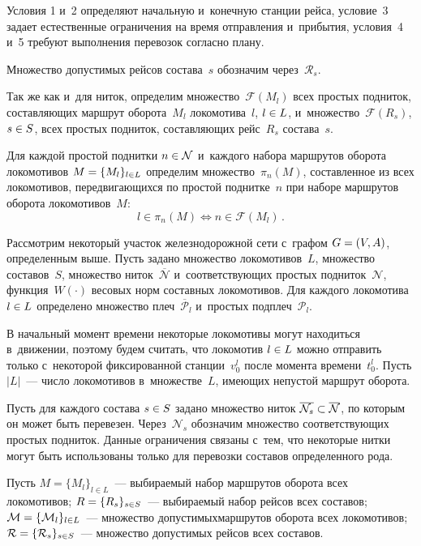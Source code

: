 \begin{multicols}{2}
Условия 1 и~2 определяют начальную и~конечную станции рейса, 
условие~3 задает естественные ограничения на время отправления и~прибытия, 
условия~4 и~5 требуют выполнения перевозок согласно плану.

Множество допустимых рейсов состава~$s$ обозначим через~$\mathcal R_s$.

Так же как и~для ниток, определим множество~$\mathcal F(M_l)$ всех простых 
подниток, со\-став\-ля\-ющих маршрут оборота~$M_l$ локомотива~$l$, $l\hm\in L$, 
и~множество~$\mathcal F(R_s)$, $s\hm\in S$, всех простых подниток, со\-став\-ля\-ющих 
рейс~$R_s$ состава~$s$.

Для каждой простой поднитки $n\hm\in\mathcal N$ и~каждого набора 
маршрутов оборота локомотивов  $M\hm=\{M_l\}_{l\in L}$ определим 
множество~$\pi_{n}(M)$, со\-став\-лен\-ное из всех локомотивов, передвигающихся 
по простой поднитке~$n$ при наборе маршрутов оборота локомотивов~$M$:
\begin{equation*}
    l\in \pi_{n}(M) \Leftrightarrow n\in\mathcal F\left(M_l\right)\,.
\end{equation*}

Рассмотрим некоторый участок железнодорожной сети с~графом $G\hm = (V, A)$, 
определенным выше. Пусть задано множество локомотивов~$L$, множество составов~$S$, 
множество ниток~$\overline{\mathcal N}$ и~соответствующих простых 
подниток~$\mathcal N$, функция~$W(\cdot)$ весовых норм составных локомотивов. 
Для каждого локомотива $l\hm\in L$ определено множество плеч~$\overline{\mathcal P}_l$ 
и~простых подплеч~$\mathcal P_l$.

В начальный момент времени некоторые локомотивы могут находиться в~движении, 
поэтому будем считать, что локомотив $l\hm\in L$ можно отправить только 
с~некоторой фиксированной станции~$v_0^l$ после момента времени~$t_0^l$.
Пусть  $|L|$~--- число локомотивов в~множестве~$L$, имеющих непустой маршрут оборота.

Пусть для каждого состава $s\hm\in S$ задано множество ниток
 $\overline{\mathcal N_s}\hm\subset \overline{\mathcal N}$, 
 по которым он может быть перевезен. Через~$\mathcal N_s$ обозначим множество 
 соответствующих простых подниток. Данные ограничения
  связаны с~тем, 
 что некоторые нитки могут быть использованы только для перевозки 
 составов определенного рода.

Пусть $M=\{M_l\}_{l\in L}$~--- выбираемый набор маршрутов оборота 
всех локомотивов; $R \hm= \{R_s\}_{s\in S}$~--- выбираемый набор 
рейсов всех со\-ста\-вов; $\mathcal{M}\hm=\{\mathcal M_l\}_{l\in L}$~---
 множество допустимых\linebreak маршрутов оборота всех локомотивов; 
 $\mathcal {R}\hm = \{\mathcal R_s\}_{s\in S}$~--- множество допустимых рейсов
  всех составов.


\end{multicols}
